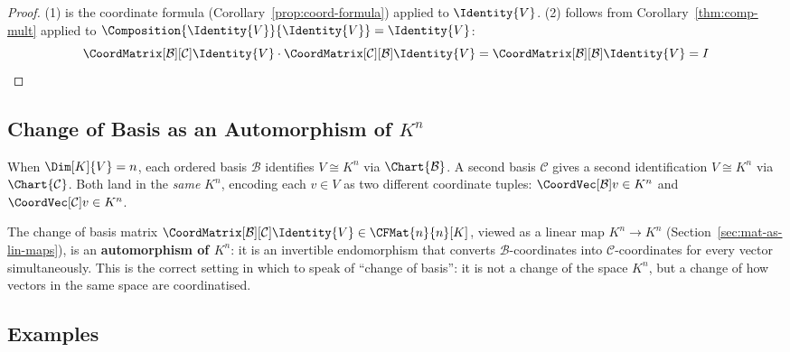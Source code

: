 \begin{proof}
    (1) is the coordinate formula (Corollary~\ref{prop:coord-formula}) applied to
    $\Identity{V}$.
    (2) follows from Corollary~\ref{thm:comp-mult} applied to
    $\Composition{\Identity{V}}{\Identity{V}} = \Identity{V}$:
    \[
        \CoordMatrix[\mathcal{B}][\mathcal{C}]{\Identity{V}}
        \cdot \CoordMatrix[\mathcal{C}][\mathcal{B}]{\Identity{V}}
        = \CoordMatrix[\mathcal{B}][\mathcal{B}]{\Identity{V}}
        = I \qedhere
    \]
\end{proof}

\subsection{Change of Basis as an Automorphism of $K^n$}

\begin{remark}
\label{rem:cob-automorphism}
    When $\Dim[K]{V} = n$, each ordered basis $\mathcal{B}$ identifies $V \cong K^n$ via
    $\Chart{\mathcal{B}}$. A second basis $\mathcal{C}$ gives a second identification
    $V \cong K^n$ via $\Chart{\mathcal{C}}$. Both land in the \emph{same} $K^n$, encoding each
    $v \in V$ as two different coordinate tuples:
    $\CoordVec[\mathcal{B}]{v} \in K^n$ and $\CoordVec[\mathcal{C}]{v} \in K^n$.

    The change of basis matrix
    $\CoordMatrix[\mathcal{B}][\mathcal{C}]{\Identity{V}} \in \CFMat{n}{n}[K]$,
    viewed as a linear map $K^n \to K^n$ (Section~\ref{sec:mat-as-lin-maps}), is an
    \textbf{automorphism of $K^n$}: it is an invertible endomorphism that converts
    $\mathcal{B}$-coordinates into $\mathcal{C}$-coordinates for every vector simultaneously.
    This is the correct setting in which to speak of ``change of basis'': it is not a change
    of the space $K^n$, but a change of how vectors in the same space are coordinatised.
\end{remark}

\subsection{Examples}

